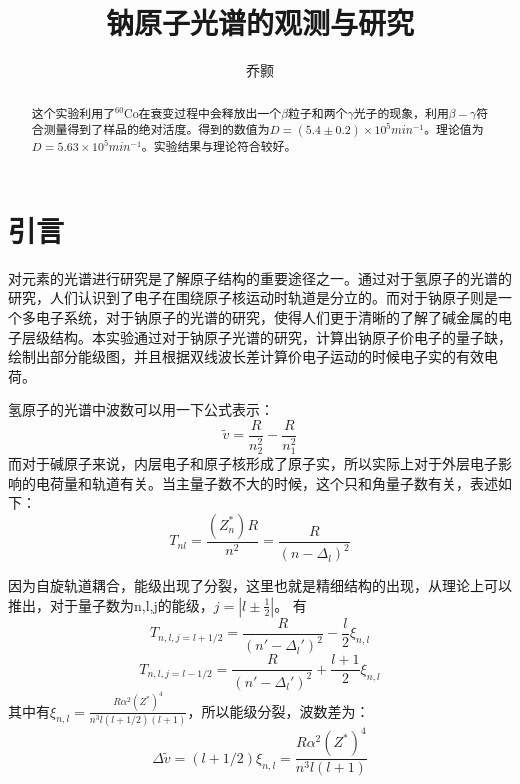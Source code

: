 \documentclass[aps,pre,12pt,preprint,onecolumn,showpacs,showkeys,UTF8]{revtex4-1}
\begin{document}
\title{\bf\heiti{}钠原子光谱的观测与研究\vspace{15mm}}
\author{\fangsong 乔颢\vspace{2mm}}
\begin{abstract}
	\vspace{10mm}
	\begin{spacing}{1.5}
		\songti{}
		这个实验利用了$^{60}$Co在衰变过程中会释放出一个$\beta$粒子和两个$\gamma$光子的现象，利用$\beta-\gamma$符合测量得到了样品的绝对活度。得到的数值为$D=(5.4\pm0.2)\times10^5 min^{-1}$。理论值为$D=5.63\times10^5 min^{-1}$。实验结果与理论符合较好。
	\end{spacing}
\end{abstract}

\maketitle

\section{引言}
对元素的光谱进行研究是了解原子结构的重要途径之一。通过对于氢原子的光谱的研究，人们认识到了电子在围绕原子核运动时轨道是分立的。而对于钠原子则是一个多电子系统，对于钠原子的光谱的研究，使得人们更于清晰的了解了碱金属的电子层级结构。本实验通过对于钠原子光谱的研究，计算出钠原子价电子的量子缺，绘制出部分能级图，并且根据双线波长差计算价电子运动的时候电子实的有效电荷。

氢原子的光谱中波数可以用一下公式表示：
\begin{equation}
	\tilde{v}=\frac{R}{n_2^2}-\frac{R}{n_1^2}
\end{equation}
而对于碱原子来说，内层电子和原子核形成了原子实，所以实际上对于外层电子影响的电荷量和轨道有关。当主量子数不大的时候，这个只和角量子数有关，表述如下：
\begin{equation}
	T_{nl}=\frac{(Z_n^*)R}{n^2}=\frac{R}{(n-\Delta_l)^2}
\end{equation}

因为自旋轨道耦合，能级出现了分裂，这里也就是精细结构的出现，从理论上可以推出，对于量子数为n,l,j的能级，$j=|l\pm\frac{1}{2}|$。 有
\begin{equation}
	T_{n,l,j=l+1/2}=\frac{R}{(n'-\Delta_l')^2}-\frac{l}{2}\xi_{n,l}
\end{equation}
\begin{equation}
	T_{n,l,j=l-1/2}=\frac{R}{(n'-\Delta_l')^2}+\frac{l+1}{2}\xi_{n,l}
\end{equation}
其中有$\xi_{n,l}=\frac{R \alpha^2(Z^*)^4}{n^3l(l+1/2)(l+1)}$，所以能级分裂，波数差为：
\begin{equation}
	\Delta \tilde{v}=(l+1/2)\xi_{n,l}=\frac{R\alpha^2(Z^*)^4}{n^3l(l+1)}
\end{equation}
\end{document}
